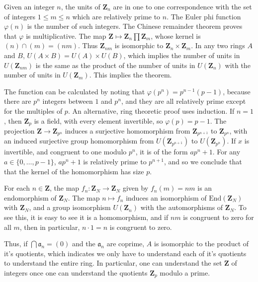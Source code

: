 \begin{example}
    Given an integer $n$, the units of $\mathbf{Z}_n$ are in one to one correspondence with the set of integers $1 \leq m \leq n$ which are relatively prime to $n$. The Euler phi function $\varphi(n)$ is the number of such integers. The Chinese remainder theorem proves that $\varphi$ is multiplicative. The map $\mathbf{Z} \mapsto \mathbf{Z}_n \prod \mathbf{Z}_m$, whose kernel is $(n) \cap (m) = (nm)$. Thus $\mathbf{Z}_{nm}$ is isomorphic to $\mathbf{Z}_n \times \mathbf{Z}_m$. In any two rings $A$ and $B$, $U(A \times B) = U(A) \times U(B)$, which implies the number of units in $U(\mathbf{Z}_{nm})$ is the same as the product of the number of units in $U(\mathbf{Z}_n)$ with the number of units in $U(\mathbf{Z}_m)$. This implies the theorem.

    The function can be calculated by noting that $\varphi(p^n) = p^{n-1}(p-1)$, because there are $p^n$ integers between $1$ and $p^n$, and they are all relatively prime except for the multiples of $p$. An alternative, ring theoretic proof uses induction. If $n = 1$, then $\mathbf{Z}_p$ is a field, with every element invertible, so $\varphi(p) = p - 1$. The projection $\mathbf{Z} \to \mathbf{Z}_{p^n}$ induces a surjective homomorphism from $\mathbf{Z}_{p^{n+1}}$ to $\mathbf{Z}_{p^n}$, with an induced surjective group homomorphism from $U(\mathbf{Z}_{p^{n+1}})$ to $U(\mathbf{Z}_{p^n})$. If $x$ is invertible, and congruent to one modulo $p^n$, it is of the form $ap^n + 1$. For any $a \in \{ 0, \dots, p-1 \}$, $ap^n + 1$ is relatively prime to $p^{n+1}$, and so we conclude that that the kernel of the homomorphism has size $p$.
\end{example}

\begin{example}
    For each $n \in \mathbf{Z}$, the map $f_n: \mathbf{Z}_N \to \mathbf{Z}_N$ given by $f_n(m) = nm$ is an endomorphism of $\mathbf{Z}_N$. The map $n \mapsto f_n$ induces an isomorphism of $\text{End}(\mathbf{Z}_N)$ with $\mathbf{Z}_N$, and a group isomorphism $U(\mathbf{Z}_n)$ with the automorphisms of $\mathbf{Z}_N$. To see this, it is easy to see it is a homomorphism, and if $nm$ is congruent to zero for all $m$, then in particular, $n \cdot 1 = n$ is congruent to zero.
\end{example}

Thus, if $\bigcap \mathfrak{a}_n = (0)$ and the $\mathfrak{a}_n$ are coprime, $A$ is isomorphic to the product of it's quotients, which indicates we only have to understand each of it's quotients to understand the entire ring. In particular, one can understand the set $\mathbf{Z}$ of integers once one can understand the quotients $\mathbf{Z}_p$ modulo a prime.

